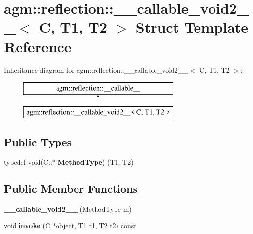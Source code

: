 \hypertarget{structagm_1_1reflection_1_1____callable__void2____}{}\section{agm\+:\+:reflection\+:\+:\+\_\+\+\_\+callable\+\_\+void2\+\_\+\+\_\+$<$ C, T1, T2 $>$ Struct Template Reference}
\label{structagm_1_1reflection_1_1____callable__void2____}
Inheritance diagram for agm\+:\+:reflection\+:\+:\+\_\+\+\_\+callable\+\_\+void2\+\_\+\+\_\+$<$ C, T1, T2 $>$\+:\begin{figure}[H]
\begin{center}
\leavevmode
\includegraphics[height=2.000000cm]{structagm_1_1reflection_1_1____callable__void2____}
\end{center}
\end{figure}
\subsection*{Public Types}
\begin{DoxyCompactItemize}
\item 
typedef void(C\+::$\ast$ {\bfseries Method\+Type}) (T1, T2)\hypertarget{structagm_1_1reflection_1_1____callable__void2_____a9b932c1e96c22ae71a6a817585235e64}{}\label{structagm_1_1reflection_1_1____callable__void2_____a9b932c1e96c22ae71a6a817585235e64}

\end{DoxyCompactItemize}
\subsection*{Public Member Functions}
\begin{DoxyCompactItemize}
\item 
{\bfseries \+\_\+\+\_\+callable\+\_\+void2\+\_\+\+\_\+} (Method\+Type m)\hypertarget{structagm_1_1reflection_1_1____callable__void2_____a7e869a5c3e4d3f3a1cece83eb880698f}{}\label{structagm_1_1reflection_1_1____callable__void2_____a7e869a5c3e4d3f3a1cece83eb880698f}

\item 
void {\bfseries invoke} (C $\ast$object, T1 t1, T2 t2) const \hypertarget{structagm_1_1reflection_1_1____callable__void2_____a6afcffd8f22c087138f6b0b796a24f7b}{}\label{structagm_1_1reflection_1_1____callable__void2_____a6afcffd8f22c087138f6b0b796a24f7b}

\end{DoxyCompactItemize}
